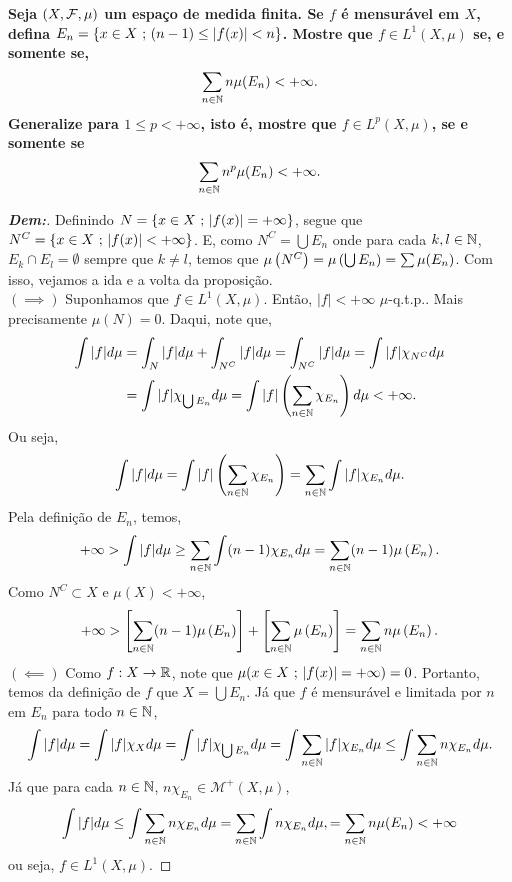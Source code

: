 \textbf{Seja $(X, \mathcal F, \mu)$ um espaço de medida finita. Se $f$ é mensurável em $X$, 
defina $E_n = \left\{x \in X \text{ ; } (n - 1) \le |f(x)| < n\right\}$. Mostre que $f \in L^1(X, \mu)$ 
se, e somente se, 
\begin{align*}
  \sum_{n \in \mathbb N} n \mu(E_n) < +\infty.
\end{align*}
Generalize para $1 \le p < +\infty$, isto é, mostre que $f \in L^p(X, \mu)$, se 
e somente se 
\begin{align*}
  \sum_{n \in \mathbb N} n^p \mu(E_n) < + \infty.
\end{align*}}
\begin{proof}[\textbf{Dem:}] Definindo $N = \{x \in X \text{ ; } |f(x)| = +\infty \}$, segue que 
  $N^C = \{x \in X \text{ ; } |f(x)| < +\infty\}$. E, como $N^C = \bigcup E_n$ onde para 
  cada $k, l \in \mathbb N$, $E_k \cap E_l = \emptyset$ sempre que $k \neq l$, temos que 
  $\mu\left(N^C\right) = \mu\left(\bigcup E_n\right) = \sum \mu(E_n)$. Com isso, vejamos a 
  ida e a volta da proposição.\\
$(\implies)$ Suponhamos que $f \in L^1(X, \mu)$. Então, $|f| < +\infty$ $\mu$-q.t.p.. Mais 
  precisamente $\mu(N) = 0$. Daqui, note que,
\begin{align*}
  \int |f| d\mu &= \int_N |f| d\mu + \int_{N^C} |f| d\mu = \int_{N^C} |f| d\mu 
  = \int |f| \chi_{N^C} d\mu\\
  &= \int |f| \chi_{\bigcup E_n} d\mu = \int |f| \left(\sum_{n \in \mathbb N} \chi_{E_n}\right)d\mu < +\infty.
\end{align*}
Ou seja, 
\begin{align*}
  \int |f| d\mu = \int |f| \left(\sum_{n \in \mathbb N} \chi_{E_n}\right) = \sum_{n \in \mathbb N} \int |f| \chi_{E_n} d\mu.
\end{align*}
Pela definição de $E_n$, temos,
\begin{align*}
  +\infty > \int |f| d\mu \ge \sum_{n \in \mathbb N} \int (n-1) \chi_{E_n} d\mu
  = \sum_{n \in \mathbb N} (n-1) \mu\left(E_n\right).
\end{align*}
  Como $N^C \subset X$ e $\mu(X) < +\infty$,
  \begin{align*}
    +\infty > \left[\sum_{n \in \mathbb N} (n - 1) \mu\left(E_n\right)\right] + 
    \left[\sum_{n \in \mathbb N} \mu\left(E_n\right)\right] 
    = \sum_{n \in \mathbb N} n\mu\left(E_n\right).
  \end{align*}
  $(\impliedby)$ Como $f: X \rightarrow \mathbb R$, note que $\mu({x \in X \text{ ; } |f(x)| = +\infty}) = 0$. Portanto, 
  temos da definição de $f$ que $X = \bigcup E_n$. Já que $f$ é mensurável e limitada por $n$ em $E_n$
  para todo $n \in \mathbb N$,
  \begin{align*}
    \int |f| d\mu = \int |f| \chi_X d\mu = \int |f| \chi_{\bigcup E_n} d\mu = \int \sum_{n \in \mathbb N} |f| \chi_{E_n} d\mu 
    \le \int \sum_{n \in \mathbb N} n \chi_{E_n} d\mu.
  \end{align*}
  Já que para cada $n \in \mathbb N$, $n \chi_{E_n} \in \mathcal M^+(X, \mu)$,
  \begin{align*}
    \int |f| d\mu \le \int \sum_{n \in \mathbb N} n \chi_{E_n} d\mu = \sum_{n \in \mathbb N} \int n \chi_{E_n}d \mu, 
    = \sum_{n \in \mathbb N} n \mu(E_n) < +\infty
  \end{align*}
  ou seja, $f \in L^1(X, \mu)$.


\end{proof}
